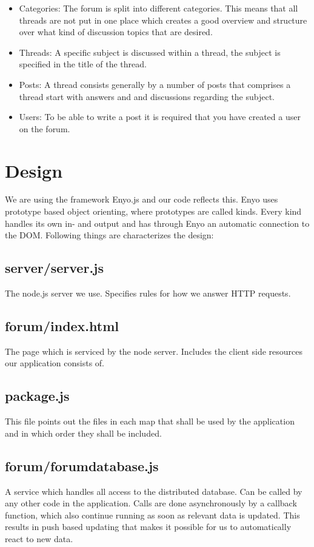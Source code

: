 \documentclass[a4paper, 12pt, titlepage]{article}
\begin{document}
\begin{itemize}

	\cbstart
	\item Categories:
				The forum is split into different categories. This means that all threads are not put in one place which creates a good overview and structure over what kind of discussion topics that are desired.
	
	\item Threads:
				A specific subject is discussed within a thread, the subject is specified in the title of the thread.
	
	\item Posts:
				A thread consists generally by a number of posts that comprises a thread start with answers and and discussions regarding the subject.
				
	\item Users:
				To be able to write a post it is required that you have created a user on the forum.
	\cbend

\end{itemize}

\section{Design} 
We are using the framework Enyo.js and our code reflects this. Enyo uses prototype based object orienting, where prototypes are called kinds. Every kind handles its own in- and output and has through Enyo an automatic connection to the DOM. Following things are characterizes the design:
    \subsection*{server/server.js} The node.js server we use. Specifies rules for how we answer HTTP requests.
    \subsection*{forum/index.html} The page which is serviced by the node server. Includes the client side resources our application consists of.
    \subsection*{package.js} This file points out the files in each map that shall be used by the application and in which order they shall be included. 
    \subsection*{forum/forumdatabase.js} A service which handles all access to the distributed database. Can be called by any other code in the application. Calls are done asynchronously by a 			callback function, which also continue running as soon as relevant data is updated. This results in push based updating that makes it possible for us to automatically react to new data.
\end{document}
